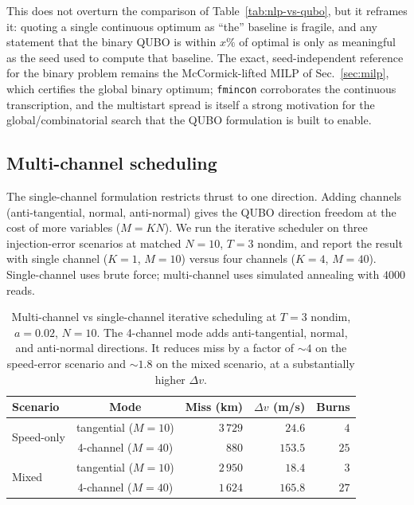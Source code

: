 \documentclass[11pt,a4paper]{article}
\theoremstyle{plain}
\begin{document}
This does not overturn the comparison of
Table~\ref{tab:nlp-vs-qubo}, but it reframes it: quoting a single
continuous optimum as ``the'' baseline is fragile, and any statement
that the binary QUBO is within $x\%$ of optimal is only as
meaningful as the seed used to compute that baseline. The exact,
seed-independent reference for the binary problem remains the
McCormick-lifted MILP of Sec.~\ref{sec:milp}, which certifies the
global binary optimum; \texttt{fmincon} corroborates the continuous
transcription, and the multistart spread is itself a strong
motivation for the global/combinatorial search that the QUBO
formulation is built to enable.

\subsection{Multi-channel scheduling}\label{sec:multi-channel}

The single-channel formulation restricts thrust to one direction.
Adding channels (anti-tangential, normal, anti-normal) gives the
QUBO direction freedom at the cost of more variables ($M = K N$).
We run the iterative scheduler on three injection-error scenarios
at matched $N = 10$, $T = 3$ nondim, and report the result with
single channel ($K = 1$, $M = 10$) versus four channels
($K = 4$, $M = 40$). Single-channel uses brute force; multi-channel
uses simulated annealing with $4000$ reads.

\begin{table}[htbp]
\centering
\begin{tabular}{lcrrr}
\toprule
Scenario & Mode & Miss (km) & $\Delta v$ (m/s) & Burns \\
\midrule
\multirow{2}{*}{Speed-only}
  & tangential ($M{=}10$) & $3\,729$ & $24.6$ & $4$ \\
  & 4-channel ($M{=}40$) & $880$ & $153.5$ & $25$ \\
\multirow{2}{*}{Mixed}
  & tangential ($M{=}10$) & $2\,950$ & $18.4$ & $3$ \\
  & 4-channel ($M{=}40$) & $1\,624$ & $165.8$ & $27$ \\
\bottomrule
\end{tabular}
\caption{Multi-channel vs single-channel iterative scheduling at
$T = 3$ nondim, $a = 0.02$, $N = 10$. The 4-channel mode adds
anti-tangential, normal, and anti-normal directions. It reduces
miss by a factor of $\sim 4$ on the speed-error scenario and
$\sim 1.8$ on the mixed scenario, at a substantially higher
$\Delta v$.}
\label{tab:multi-channel}
\end{table}
\end{document}
